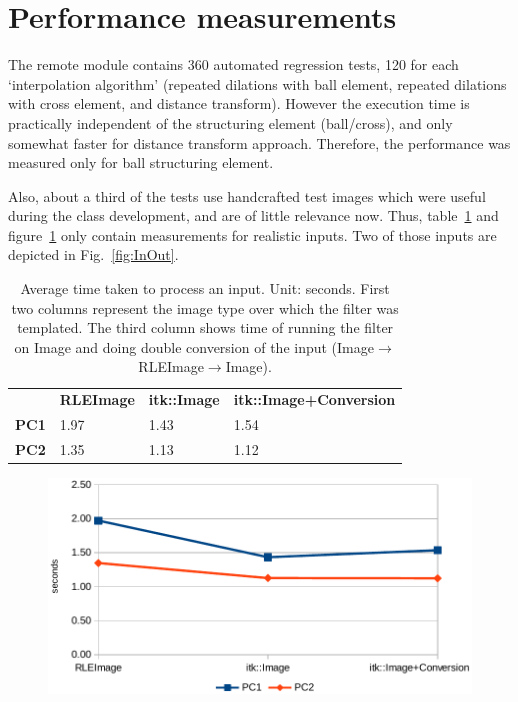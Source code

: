\documentclass{InsightArticle}
\begin{document}
\section{Performance measurements}

The remote module %
contains 360 automated regression tests, 120 for each `interpolation algorithm'
(repeated dilations with ball element, repeated dilations with cross element, and distance transform).
However the execution time is practically independent of the structuring element (ball/cross),
and only somewhat faster for distance transform approach.
Therefore, the performance was measured only for ball structuring element.

Also, about a third of the tests use handcrafted test images
which were useful during the class development, and are of little relevance now.
Thus, table~\ref{tab:time} and figure~\ref{fig:time} only contain measurements for realistic inputs.
Two of those inputs are depicted in Fig.~\ref{fig:InOut}.

\begin{table}[hbt]
    \centering
        \begin{tabular}{llll}
                     & \textbf{RLEImage} & \textbf{itk::Image} & \textbf{itk::Image+Conversion} \\
        \textbf{PC1} & 1.97              & 1.43                & 1.54                           \\
        \textbf{PC2} & 1.35              & 1.13                & 1.12
        \end{tabular}
    \caption{Average time taken to process an input. Unit: seconds.
    First two columns represent the image type over which the filter was templated.
    The third column shows time of running the filter on Image
    and doing double conversion of the input (Image$\rightarrow$RLEImage$\rightarrow$Image).}
    \label{tab:time}
\end{table}

\begin{figure}[htb]
\center
\includegraphics{Time.pdf}
\label{fig:time}
\end{figure}
\end{document}
